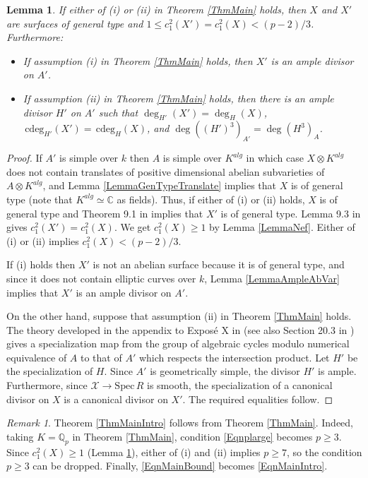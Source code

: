 \documentclass[11pt]{amsart}
\newtheorem{lemma}[theorem]{Lemma}
\theoremstyle{remark}
\newtheorem{remark}[theorem]{Remark}
\numberwithin{equation}{section}
\newcommand{\Xcal}{\mathscr{X}}
\newcommand{\C}{\mathbb{C}}
\newcommand{\Q}{\mathbb{Q}}
\newcommand{\Spec}{\mathrm{Spec}\,}
\newcommand{\cdeg}{\,\mathrm{cdeg}}
\begin{document}
\begin{lemma}\label{LemmaHyps} If either of (i) or (ii) in Theorem \ref{ThmMain} holds, then $X$ and $X'$ are surfaces of general type and $1\le c_1^2(X')=c_1^2(X)<(p-2)/3$. Furthermore:

\begin{itemize}

\item If assumption (i) in Theorem \ref{ThmMain} holds, then $X'$  is an ample divisor on $A'$. 

\item If assumption (ii) in Theorem \ref{ThmMain} holds, then there is an ample divisor $H'$ on $A'$ such that $\deg_{H'}(X')=\deg_H(X)$, $\cdeg_{H'}(X')=\cdeg_H(X)$, and $\deg((H')^3)_{A'}=\deg(H^3)_A$.
\end{itemize}
\end{lemma}
\begin{proof} If $A'$ is simple over $k$ then $A$ is simple over $K^{alg}$ in which case $X\otimes K^{alg}$ does not contain translates of positive dimensional abelian subvarieties of $A\otimes K^{alg}$, and Lemma \ref{LemmaGenTypeTranslate} implies that $X$ is of general type (note that $K^{alg}\simeq \C$ as fields). Thus, if either of (i) or (ii) holds, $X$ is of general type and Theorem 9.1 in \cite{KatsuraUeno} implies that $X'$ is of general type. Lemma 9.3 in \cite{KatsuraUeno} gives $c_1^2(X')=c_1^2(X)$. We get $c_1^2(X)\ge 1$ by Lemma \ref{LemmaNef}. Either of (i) or (ii) implies $c_1^2(X)< (p-2)/3$.

If (i) holds then $X'$ is not an abelian surface because it is of general type, and since it does not contain elliptic curves over $k$, Lemma \ref{LemmaAmpleAbVar} implies that $X'$ is an ample divisor on $A'$. 

On the other hand, suppose that assumption (ii)  in Theorem \ref{ThmMain} holds. The  theory developed in the appendix to Expos\'e X in \cite{SGA6} (see also Section 20.3 in \cite{FultonInt}) gives a specialization map from the group of algebraic cycles  modulo numerical equivalence of $A$ to that of $A'$ which respects the intersection product. Let $H'$ be the specialization of $H$. Since $A'$ is geometrically simple, the divisor $H'$ is ample. Furthermore, since $\Xcal\to \Spec R$ is smooth, the specialization of a canonical divisor on $X$ is a canonical divisor on $X'$. The required equalities follow.
\end{proof}
\begin{remark}\label{RmkMainToIntro} Theorem \ref{ThmMainIntro} follows from Theorem \ref{ThmMain}. Indeed, taking $K=\Q_p$ in Theorem \ref{ThmMain}, condition \eqref{Eqnplarge} becomes $p\ge 3$. Since $c_1^2(X)\ge 1$ (Lemma \ref{LemmaHyps}), either of (i) and (ii) implies $p\ge 7$, so the condition $p\ge 3$ can be dropped. Finally, \eqref{EqnMainBound} becomes \eqref{EqnMainIntro}.
\end{remark}
\end{document}
